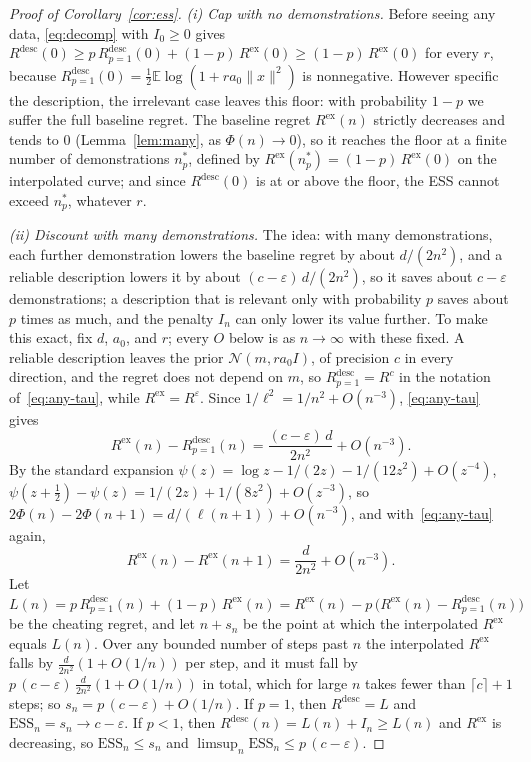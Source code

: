 \documentclass{article}
\newcommand{\ess}{\mathrm{ESS}}
\newcommand{\E}{\mathbb{E}}
\begin{document}
\begin{proof}[Proof of Corollary~\ref{cor:ess}]
\emph{(i) Cap with no demonstrations.} Before seeing any data, \eqref{eq:decomp} with $I_0 \ge 0$ gives $R^{\mathrm{desc}}(0) \ge p\,R^{\mathrm{desc}}_{p=1}(0) + (1-p)\,R^{\mathrm{ex}}(0) \ge (1-p)\,R^{\mathrm{ex}}(0)$ for every $r$, because $R^{\mathrm{desc}}_{p=1}(0) = \tfrac12 \E \log(1 + r a_0 \|x\|^2)$ is nonnegative. However specific the description, the irrelevant case leaves this floor: with probability $1-p$ we suffer the full baseline regret. The baseline regret $R^{\mathrm{ex}}(n)$ strictly decreases and tends to $0$ (Lemma~\ref{lem:many}, as $\Phi(n) \to 0$), so it reaches the floor at a finite number of demonstrations $n^*_p$, defined by $R^{\mathrm{ex}}(n^*_p) = (1-p)\,R^{\mathrm{ex}}(0)$ on the interpolated curve; and since $R^{\mathrm{desc}}(0)$ is at or above the floor, the ESS cannot exceed $n^*_p$, whatever $r$.

\emph{(ii) Discount with many demonstrations.} The idea: with many demonstrations, each further demonstration lowers the baseline regret by about $d/(2n^2)$, and a reliable description lowers it by about $(c - \varepsilon)\,d/(2n^2)$, so it saves about $c - \varepsilon$ demonstrations; a description that is relevant only with probability $p$ saves about $p$ times as much, and the penalty $I_n$ can only lower its value further. To make this exact, fix $d$, $a_0$, and $r$; every $O$ below is as $n \to \infty$ with these fixed. A reliable description leaves the prior $\mathcal{N}(m, r a_0 I)$, of precision $c$ in every direction, and the regret does not depend on $m$, so $R^{\mathrm{desc}}_{p=1} = R^{c}$ in the notation of~\eqref{eq:any-tau}, while $R^{\mathrm{ex}} = R^{\varepsilon}$. Since $1/\ell^2 = 1/n^2 + O(n^{-3})$, \eqref{eq:any-tau} gives
\[
R^{\mathrm{ex}}(n) - R^{\mathrm{desc}}_{p=1}(n) = \frac{(c - \varepsilon)\,d}{2n^2} + O(n^{-3}).
\]
By the standard expansion $\psi(z) = \log z - 1/(2z) - 1/(12z^2) + O(z^{-4})$, $\psi(z + \tfrac12) - \psi(z) = 1/(2z) + 1/(8z^2) + O(z^{-3})$, so $2\Phi(n) - 2\Phi(n+1) = d/(\ell(n+1)) + O(n^{-3})$, and with~\eqref{eq:any-tau} again,
\[
R^{\mathrm{ex}}(n) - R^{\mathrm{ex}}(n+1) = \frac{d}{2n^2} + O(n^{-3}).
\]
Let $L(n) = p\,R^{\mathrm{desc}}_{p=1}(n) + (1-p)\,R^{\mathrm{ex}}(n) = R^{\mathrm{ex}}(n) - p\,\big(R^{\mathrm{ex}}(n) - R^{\mathrm{desc}}_{p=1}(n)\big)$ be the cheating regret, and let $n + s_n$ be the point at which the interpolated $R^{\mathrm{ex}}$ equals $L(n)$. Over any bounded number of steps past $n$ the interpolated $R^{\mathrm{ex}}$ falls by $\tfrac{d}{2n^2}(1 + O(1/n))$ per step, and it must fall by $p\,(c - \varepsilon)\,\tfrac{d}{2n^2}(1 + O(1/n))$ in total, which for large $n$ takes fewer than $\lceil c \rceil + 1$ steps; so $s_n = p\,(c - \varepsilon) + O(1/n)$. If $p = 1$, then $R^{\mathrm{desc}} = L$ and $\ess_n = s_n \to c - \varepsilon$. If $p < 1$, then $R^{\mathrm{desc}}(n) = L(n) + I_n \ge L(n)$ and $R^{\mathrm{ex}}$ is decreasing, so $\ess_n \le s_n$ and $\limsup_n \ess_n \le p\,(c - \varepsilon)$.
\end{proof}
\end{document}
